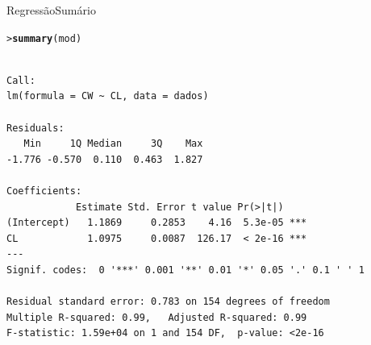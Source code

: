 \documentclass[10pt]{beamer}\usepackage{graphicx, color}
\makeatletter
\newcommand{\hlfunctioncall}[1]{\textcolor[rgb]{0,0,0.545098039215686}{\textbf{#1}}}%
\newenvironment{kframe}{%
 \def\at@end@of@kframe{}%
 \ifinner\ifhmode%
  \def\at@end@of@kframe{\end{minipage}}%
  \begin{minipage}{\columnwidth}%
 \fi\fi%
 \def\FrameCommand##1{\hskip\@totalleftmargin \hskip-\fboxsep
 \colorbox{shadecolor}{##1}\hskip-\fboxsep
     \hskip-\linewidth \hskip-\@totalleftmargin \hskip\columnwidth}%
 \MakeFramed {\advance\hsize-\width
   \@totalleftmargin\z@ \linewidth\hsize
   \@setminipage}}%
 {\par\unskip\endMakeFramed%
 \at@end@of@kframe}
\newenvironment{knitrout}{}{} %
\makeatother
\begin{document}
\begin{frame}[fragile=singleslide]{Regressão}{Sumário}
\begin{knitrout}\footnotesize
{}\color{fgcolor}\begin{kframe}
\begin{alltt}
> \hlfunctioncall{summary}(mod)
\end{alltt}
\begin{verbatim}

Call:
lm(formula = CW ~ CL, data = dados)

Residuals:
   Min     1Q Median     3Q    Max 
-1.776 -0.570  0.110  0.463  1.827 

Coefficients:
            Estimate Std. Error t value Pr(>|t|)    
(Intercept)   1.1869     0.2853    4.16  5.3e-05 ***
CL            1.0975     0.0087  126.17  < 2e-16 ***
---
Signif. codes:  0 '***' 0.001 '**' 0.01 '*' 0.05 '.' 0.1 ' ' 1 

Residual standard error: 0.783 on 154 degrees of freedom
Multiple R-squared: 0.99,	Adjusted R-squared: 0.99 
F-statistic: 1.59e+04 on 1 and 154 DF,  p-value: <2e-16 

\end{verbatim}
\end{kframe}
\end{knitrout}

\end{frame}
\end{document}
